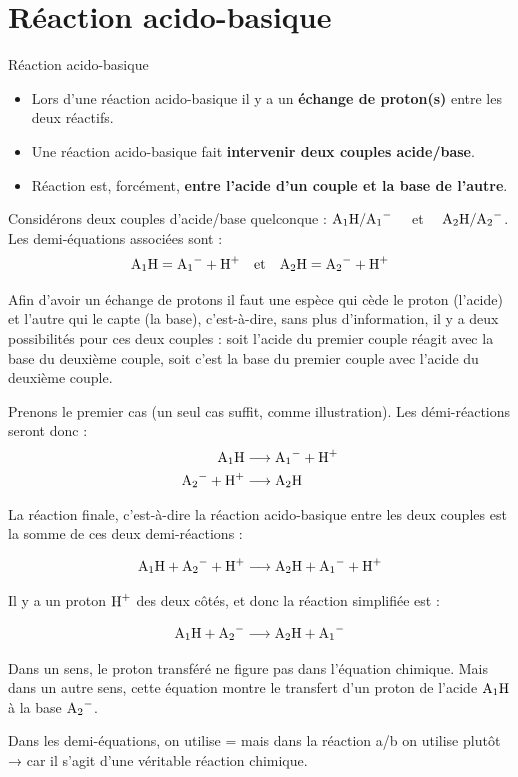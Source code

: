\documentclass[11pt,a4paper]{article}
\begin{document}
\section{Réaction acido-basique}%

\begin{defn}{Réaction acido-basique}
\begin{itemize}
    \item Lors d'une réaction acido-basique il y a un \textbf{échange de proton(s)} entre les deux réactifs. 
    \item Une réaction acido-basique fait \textbf{intervenir deux couples acide/base}. 
    \item Réaction est, forcément, \textbf{entre l'acide d'un couple et la base de l'autre}. 
\end{itemize}
\end{defn}

Considérons deux couples d'acide/base quelconque : $\ce{A1H}/\ce{A1-} \quad $ et $\quad \ce{A2H}/\ce{A2-}$. Les demi-équations associées sont : 
$$ \ce{A1H} = \ce{A1-} + \ce{H+}\quad \text{et}\quad \ce{A2H} = \ce{A2-} + \ce{H+}$$

Afin d'avoir un échange de protons il faut une espèce qui cède le proton (l'acide) et l'autre qui le capte (la base), c'est-à-dire, sans plus d'information, il y a deux possibilités pour ces deux couples : soit l'acide du premier couple réagit avec la base du deuxième couple, soit c'est la base du premier couple avec l'acide du deuxième couple. 

Prenons le premier cas (un seul cas suffit, comme illustration). Les démi-réactions seront donc : 
\begin{align*}
    \ce{A1H} &\To \ce{A1-} + \ce{H+} \\
    \ce{A2-} + \ce{H+} &\To \ce{A2H}
\end{align*}

La réaction finale, c'est-à-dire la réaction acido-basique entre les deux couples est la somme de ces deux demi-réactions : 

$$\ce{A1H} + \ce{A2-} + \ce{H+} \To \ce{A2H} + \ce{A1-} + \ce{H+} $$

Il y a un proton $\ce{H+}$ des deux côtés, et donc la réaction simplifiée est  : 

$$\ce{A1H} + \ce{A2-} \To \ce{A2H} + \ce{A1-} $$

\begin{rmrq}
Dans un sens, le proton transféré ne figure pas dans l’équation chimique. Mais dans un autre sens, cette équation montre le transfert d’un proton de l’acide $\ce{A1H}$ à la base $\ce{A_2^-}$. 

Dans les demi-équations, on utilise = mais dans la réaction a/b on utilise plutôt → car il s’agit d’une véritable réaction chimique. 

\end{rmrq}
\end{document}
